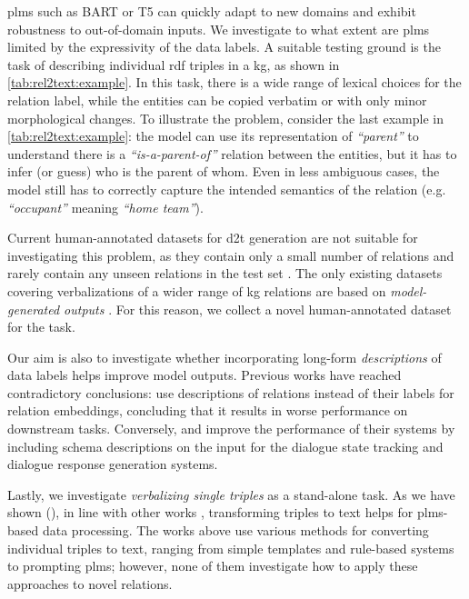 \acp{plm} such as BART \cite{lewisBARTDenoisingSequencetoSequence2019} or T5 \cite{raffelExploringLimitsTransfer2019} can quickly adapt to new domains and exhibit robustness to out-of-domain inputs. We investigate to what extent are \acp{plm} limited by the expressivity of the data labels. A suitable testing ground is the task of describing individual \acs{rdf} triples in a \ac{kg}, as shown in \autoref{tab:rel2text:example}. In this task, there is a wide range of lexical choices for the relation label, while the entities can be copied verbatim or with only minor morphological changes. To illustrate the problem, consider the last example in \autoref{tab:rel2text:example}: the model can use its representation of \emph{``parent''} to understand there is a \emph{``is-a-parent-of''} relation between the entities, but it has to infer (or guess) who is the parent of whom. Even in less ambiguous cases, the model still has to correctly capture the intended semantics of the relation (e.g. \emph{``occupant''} meaning \emph{``home team''}).


Current human-annotated datasets for \ac{d2t} generation are not suitable for investigating this problem, as they contain only a small number of relations and rarely contain any unseen relations in the test set \cite{mille2021automatic}. The only existing datasets covering verbalizations of a wider range of \ac{kg} relations are based on \emph{model-generated outputs} \cite{agarwalKnowledgeGraphBased2021,amaral2022wdv}. For this reason, we collect a novel human-annotated dataset for the task.

Our aim is also to investigate whether incorporating long-form \emph{descriptions} of data labels helps improve model outputs. Previous works have reached contradictory conclusions: \citet{wang2021kepler} use descriptions of relations instead of their labels for relation embeddings, concluding that it results in worse performance on downstream tasks. Conversely, \citet{kale-rastogi-2020-template} and \citet{lee2021dialogue} improve the performance of their systems by including schema descriptions on the input for the dialogue state tracking and dialogue response generation systems.

Lastly, we investigate \emph{verbalizing single triples} as a stand-alone task. As we have shown (), in line with other works \cite{xiangASDOTAnyShotDatatoText2022,kale-rastogi-2020-template,gupta2020infotabs,neeraja2021incorporating}, transforming triples to text helps for \acp{plm}-based data processing. The works above use various methods for converting individual triples to text, ranging from simple templates and rule-based systems to prompting \acp{plm}; however, none of them investigate how to apply these approaches to novel relations.


